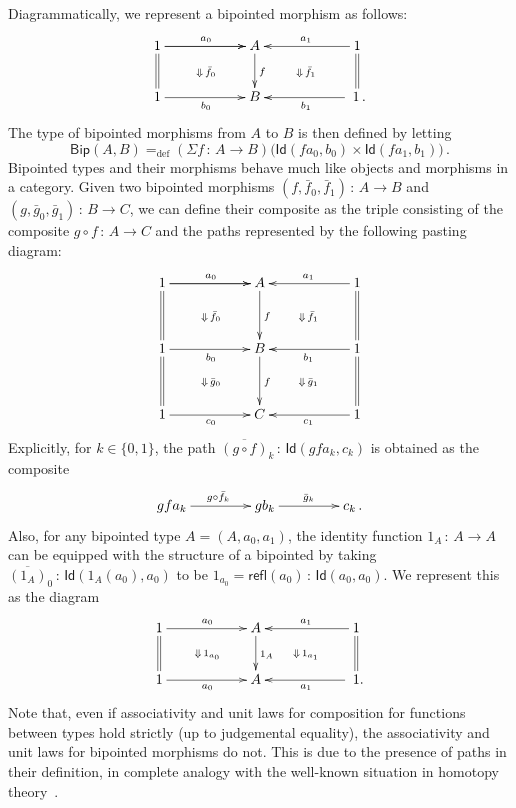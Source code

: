\documentclass[10pt,a4paper,oneside,reqno]{amsart}
\numberwithin{equation}{section}
\theoremstyle{mythm}
\theoremstyle{mydef}
\theoremstyle{myrmk}
\newcommand{\ie}{\text{i.e.\ }}
\newcommand{\defeq}{=_{\mathrm{def}}}
\newcommand{\co}{\,{:}\,}
\newcommand{\Id}{\mathsf{Id}}
\newcommand{\refl}{\mathsf{refl}}
\newcommand{\BipHom}{\mathsf{Bip}}
\begin{document}
Diagrammatically, we represent a bipointed morphism as follows:
\[
\xymatrix@C=2cm{
1 \ar[r]   \ar[r]^{a_0} \ar@{=}[d]  \ar@{}[dr]|{\Downarrow \, \bar{f}_0} & A  \ar[d]^{f} & 1  \ar[l]_{a_1} \ar@{=}[d] \ar@{}[dl]|{\Downarrow \,  \bar{f}_1} \\
1 \ar[r]_{b_0}  & B   & \; 1 \, . \ar[l]^{b_1} }
 \]
The type of bipointed morphisms from $A$ to $B$ is then defined by letting
\[
\BipHom(A,B) \defeq (\Sigma f \co A \to B) \big( \Id(  f a_0, b_0 )  \times \Id(  f a_1 , b_1 )  \big) \, .
\]
 Bipointed types and their morphisms behave much like objects and morphisms in a category.
Given two bipointed morphisms  $(f, \bar{f}_0, \bar{f}_1) \co A \to B$ and $(g, \bar{g}_0, \bar{g}_1) \co B \to C$, we can define their composite 
 as the triple consisting of the composite $g \circ f \co A \to C$ and the paths represented
by the following pasting diagram:
\[
\xymatrix@C=2cm@R=1.2cm{
1 \ar[r]   \ar[r]^{a_0} \ar@{=}[d]  \ar@{}[dr]|{\Downarrow \, \bar{f}_0} & A  \ar[d]^{f} & 1  \ar[l]_{a_1} \ar@{=}[d] \ar@{}[dl]|{\Downarrow \,  \bar{f}_1} \\
1 \ar[r]_{b_0}   \ar@{}[dr]|{\Downarrow \, \bar{g}_0}  \ar@{=}[d] & B \ar[d]^f   & 1 \ar[l]^{b_1} \ar@{=}[d] \ar@{}[dl]|{\Downarrow \,  \bar{g}_1} \\
1 \ar[r]_{c_0}  & C   & 1 \ar[l]^{c_1}}
 \]
Explicitly, for $k \in \{ 0, 1 \}$, the path $\overline{(g \circ f)}_k \co \Id( g f a_k, c_k)$ is obtained as the composite
\[
\xymatrix@C=1.5cm{
g f a_k \ar[r]^{g \circ \bar{f}_k} & g b_k \ar[r]^{\bar{g}_k} & c_k \, .}
\]
Also, for any bipointed type $A = (A, a_0, a_1)$, the identity function $1_A \co A \to A$ can be equipped with the structure of a bipointed by taking $\overline{(1_A)}_0 \co \Id( 1_A(a_0), a_0)$ to be $1_{a_0} = \refl(a_0) \co \Id(a_0, a_0)$. We represent this as the
diagram
 \begin{equation}
 \label{equ:bipidA}
{\vcenter{\hbox{\xymatrix@C=2cm{
1 \ar[r]^{a_0} \ar@{=}[d] \ar@{}[dr]|{\Downarrow \, 1_{a_0}}& A \ar[d]^{1_A} & 
1 \ar[l]_{a_1} \ar@{=}[d]  \ar@{}[dl]|{\Downarrow \, 1_{a_1}}  \\ 
 1 \ar[r]_{a_0} & A & \; 1 .\ar[l]^{a_1} }}}}
 \end{equation}
 Note that, even if associativity and unit laws for composition for functions between types hold strictly
 (\ie up to judgemental equality), the  associativity and unit laws for bipointed morphisms do not. This
 is due to the presence of paths in their definition, in complete analogy with the well-known situation
 in homotopy theory~\cite{BoardmanM:homias}. 
\end{document}
